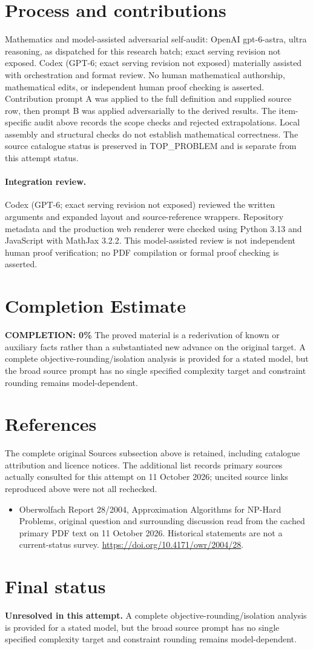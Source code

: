 \documentclass[11pt]{article}
\begin{document}
\section{Process and contributions}
Mathematics and model-assisted adversarial self-audit: OpenAI gpt-6-astra, ultra reasoning, as dispatched for this research batch; exact serving revision not exposed. Codex (GPT-6; exact serving revision not exposed) materially assisted with orchestration and format review. No human mathematical authorship, mathematical edits, or independent human proof checking is asserted.
Contribution prompt A was applied to the full definition and supplied source row, then prompt B was applied adversarially to the derived results. The item-specific audit above records the scope checks and rejected extrapolations. Local assembly and structural checks do not establish mathematical correctness. The source catalogue status is preserved in TOP\_PROBLEM and is separate from this attempt status.
\paragraph{Integration review.} Codex (GPT-6; exact serving revision not exposed) reviewed the written arguments and expanded layout and source-reference wrappers. Repository metadata and the production web renderer were checked using Python 3.13 and JavaScript with MathJax 3.2.2. This model-assisted review is not independent human proof verification; no PDF compilation or formal proof checking is asserted.

\section{Completion Estimate}
\noindent\textbf{COMPLETION: 0\%}
The proved material is a rederivation of known or auxiliary facts rather than a substantiated new advance on the original target. A complete objective-rounding/isolation analysis is provided for a stated model, but the broad source prompt has no single specified complexity target and constraint rounding remains model-dependent.
\section{References}
The complete original Sources subsection above is retained, including catalogue attribution and licence notices. The additional list records primary sources actually consulted for this attempt on 11 October 2026; uncited source links reproduced above were not all rechecked.
\begin{itemize}
\item Oberwolfach Report 28/2004, Approximation Algorithms for NP-Hard Problems, original question and surrounding discussion read from the cached primary PDF text on 11 October 2026. Historical statements are not a current-status survey. \url{https://doi.org/10.4171/owr/2004/28}.
\end{itemize}
\section{Final status}
\textbf{Unresolved in this attempt.} A complete objective-rounding/isolation analysis is provided for a stated model, but the broad source prompt has no single specified complexity target and constraint rounding remains model-dependent.
\end{document}
